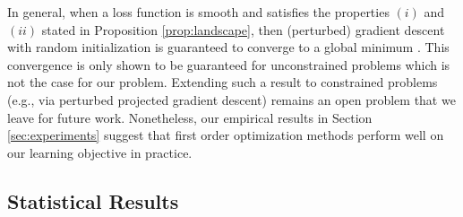 \documentclass[11pt]{article}
\renewcommand{\cite}{\citep}
\newcommand{\<}{\langle}
\renewcommand{\>}{\rangle}
\numberwithin{equation}{section}
\begin{document}
In general, when a loss function is smooth and satisfies the properties $(i)$ and $(ii)$ stated in Proposition \ref{prop:landscape}, then (perturbed) gradient descent with random initialization is guaranteed to converge to a global minimum \cite{ge2015escaping,lee2016gradient,jin2017escape}. This convergence is only shown to be guaranteed for unconstrained problems which is not the case for our problem. Extending such a result to constrained problems (e.g., via perturbed projected gradient descent) remains an open problem that we leave for future work. Nonetheless, our empirical results in Section \ref{sec:experiments} suggest that first order optimization methods perform well on our learning objective in practice.




\subsection{Statistical Results}\label{subsec:statistical}
\end{document}
